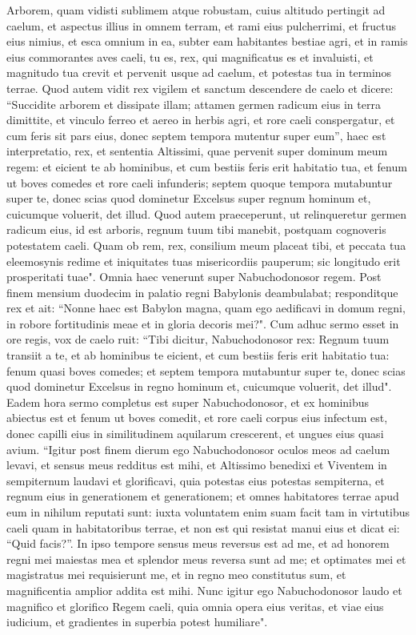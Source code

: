 \begin{biblechapter}
\verse Arborem, quam vidisti sublimem atque robustam, cuius altitudo pertingit ad caelum, et aspectus illius in omnem terram, 
\verse et rami eius pulcherrimi, et fructus eius nimius, et esca omnium in ea, subter eam habitantes bestiae agri, et in ramis eius commorantes aves caeli, 
\verse tu es, rex, qui magnificatus es et invaluisti, et magnitudo tua crevit et pervenit usque ad caelum, et potestas tua in terminos terrae. 
\verse Quod autem vidit rex vigilem et sanctum descendere de caelo et dicere: “Succidite arborem et dissipate illam; attamen germen radicum eius in terra dimittite, et vinculo ferreo et aereo in herbis agri, et rore caeli conspergatur, et cum feris sit pars eius, donec septem tempora mutentur super eum”, 
\verse haec est interpretatio, rex, et sententia Altissimi, quae pervenit super dominum meum regem: 
\verse et eicient te ab hominibus, et cum bestiis feris erit habitatio tua, et fenum ut boves comedes et rore caeli infunderis; septem quoque tempora mutabuntur super te, donec scias quod dominetur Excelsus super regnum hominum et, cuicumque voluerit, det illud. 
\verse Quod autem praeceperunt, ut relinqueretur germen radicum eius, id est arboris, regnum tuum tibi manebit, postquam cognoveris potestatem caeli.  
\verse Quam ob rem, rex, consilium meum placeat tibi, et peccata tua eleemosynis redime et iniquitates tuas misericordiis pauperum; sic longitudo erit prosperitati tuae". 
\verse Omnia haec venerunt super Nabuchodonosor regem. 
\verse Post finem mensium duodecim in palatio regni Babylonis deambulabat; 
\verse responditque rex et ait: “Nonne haec est Babylon magna, quam ego aedificavi in domum regni, in robore fortitudinis meae et in gloria decoris mei?". 
\verse Cum adhuc sermo esset in ore regis, vox de caelo ruit: “Tibi dicitur, Nabuchodonosor rex: Regnum tuum transiit a te, 
\verse et ab hominibus te eicient, et cum bestiis feris erit habitatio tua: fenum quasi boves comedes; et septem tempora mutabuntur super te, donec scias quod dominetur Excelsus in regno hominum et, cuicumque voluerit, det illud". 
\verse Eadem hora sermo completus est super Nabuchodonosor, et ex hominibus abiectus est et fenum ut boves comedit, et rore caeli corpus eius infectum est, donec capilli eius in similitudinem aquilarum crescerent, et ungues eius quasi avium. 
\verse “Igitur post finem dierum ego Nabuchodonosor oculos meos ad caelum levavi, et sensus meus redditus est mihi, et Altissimo benedixi et Viventem in sempiternum laudavi et glorificavi, quia potestas eius potestas sempiterna, et regnum eius in generationem et generationem; 
\verse et omnes habitatores terrae apud eum in nihilum reputati sunt: iuxta voluntatem enim suam facit tam in virtutibus caeli quam in habitatoribus terrae, et non est qui resistat manui eius et dicat ei: “Quid facis?”. 
\verse In ipso tempore sensus meus reversus est ad me, et ad honorem regni mei maiestas mea et splendor meus reversa sunt ad me; et optimates mei et magistratus mei requisierunt me, et in regno meo constitutus sum, et magnificentia amplior addita est mihi. 
\verse Nunc igitur ego Nabuchodonosor laudo et magnifico et glorifico Regem caeli, quia omnia opera eius veritas, et viae eius iudicium, et gradientes in superbia potest humiliare". 
\end{biblechapter}

